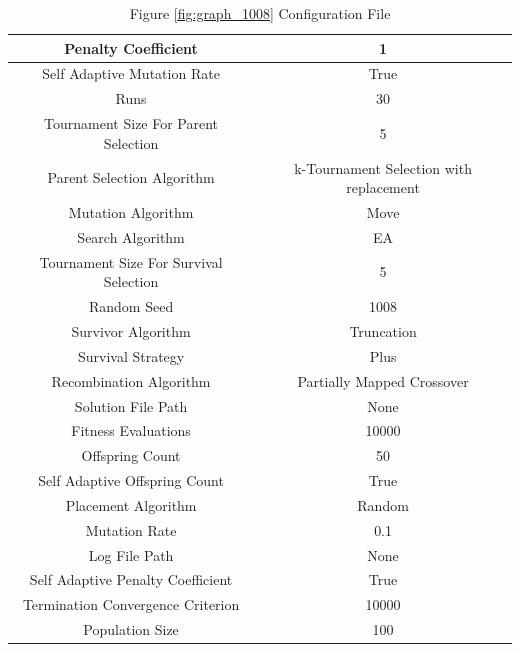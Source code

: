 \documentclass{standalone}
\begin{document}
\begin{table}[!htb]
	\centering
	\caption{Figure \ref{fig:graph_1008} Configuration File}
	\label{tab:graph_1008}
	\begin{tabular}{| c | c |}
		\hline
		Penalty Coefficient		& 1		 \\
		\hline
		Self Adaptive Mutation Rate		& True		 \\
		\hline
		Runs		& 30		 \\
		\hline
		Tournament Size For Parent Selection		& 5		 \\
		\hline
		Parent Selection Algorithm		& k-Tournament Selection with replacement		 \\
		\hline
		Mutation Algorithm		& Move		 \\
		\hline
		Search Algorithm		& EA		 \\
		\hline
		Tournament Size For Survival Selection		& 5		 \\
		\hline
		Random Seed		& 1008		 \\
		\hline
		Survivor Algorithm		& Truncation		 \\
		\hline
		Survival Strategy		& Plus		 \\
		\hline
		Recombination Algorithm		& Partially Mapped Crossover		 \\
		\hline
		Solution File Path		& None		 \\
		\hline
		Fitness Evaluations		& 10000		 \\
		\hline
		Offspring Count		& 50		 \\
		\hline
		Self Adaptive Offspring Count		& True		 \\
		\hline
		Placement Algorithm		& Random		 \\
		\hline
		Mutation Rate		& 0.1		 \\
		\hline
		Log File Path		& None		 \\
		\hline
		Self Adaptive Penalty Coefficient		& True		 \\
		\hline
		Termination Convergence Criterion		& 10000		 \\
		\hline
		Population Size		& 100		 \\
		\hline
	\end{tabular}
\end{table}
\end{document}
